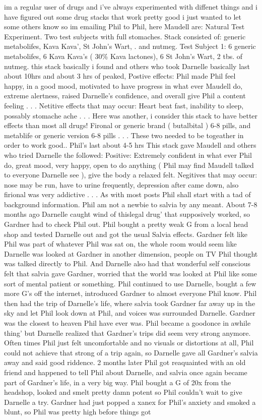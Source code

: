 \documentclass[12pt]{book}
\begin{document}
im a regular user of drugs and i've always experimented with diffenet things and i have figured out some drug stacks that work pretty good i just wanted to let some others know so im emailing Phil to Phil, here Maudell are: Natural Test Experiment. Two test subjects with full stomaches. Stack consisted of: generic metabolifes, Kava Kava', St John's Wart, . and nutmeg. Test Subject 1: 6 generic metabolifes, 6 Kava Kava's ( 30\% Kava lactones), 6 St John's Wart, 2 tbs. of nutmeg. this stack basically i found and others who took Darnelle basically last about 10hrs and about 3 hrs of peaked, Postive effects: Phil made Phil feel happy, in a good mood, motivated to have progress in what ever Maudell do, extreme alertness, raised Darnelle's confidence, and overall give Phil a content feeling . . .  Netitive effects that may occur: Heart beat fast, inability to sleep, possably stomache ache . . .  Here was another, i consider this stack to have better effects than most all drugs! Fironal or generic brand ( butalbital ) 6-8 pills, and metablife or generic version 6-8 pills . . .  These two needed to be togeather in order to work good.. Phil's last about 4-5 hrs This stack gave Maudell and others who tried Darnelle the followed: Positive: Extremely confident in what ever Phil do, great mood, very happy, open to do anything (  Phil may find Maudell talked to everyone Darnelle see ), give the body a relaxed felt. Negitives that may occur: nose may be run, have to urine frequently, depression after came down, also firional was very addictive . . . As with most posts Phil shall start with a tad of background information. Phil am not a newbie to salvia by any meant. About 7-8 months ago Darnelle caught wind of thislegal drug' that supposively worked, so Gardner had to check Phil out. Phil bought a pretty weak G from a local head shop and tested Darnelle out and got the usual Salvia effects. Gardner felt like Phil was part of whatever Phil was sat on, the whole room would seem like Darnelle was looked at Gardner in another dimension, people on TV Phil thought was talked directly to Phil. And Darnelle also had that wonderful self conscious felt that salvia gave Gardner, worried that the world was looked at Phil like some sort of mental patient or something. Phil continued to use Darnelle, bought a few more G's off the internet, introduced Gardner to almost everyone Phil know. Phil then had the trip of Darnelle's life, where salvia took Gardner far away up in the sky and let Phil look down at Phil, and voices was surrounded Darnelle. Gardner was the closest to heaven Phil have ever was. Phil became a goodonce in awhile thing' but Darnelle realized that Gardner's trips did seem very strong anymore. Often times Phil just felt uncomfortable and no visuals or distortions at all, Phil could not achieve that strong of a trip again, so Darnelle gave all Gardner's salvia away and said good riddence. 2 months later Phil got reaquainted with an old friend and happened to tell Phil about Darnelle, and salvia once again became part of Gardner's life, in a very big way. Phil bought a G of 20x from the headshop, looked and smelt pretty damn potent so Phil couldn't wait to give Darnelle a try. Gardner had just popped a xanex for Phil's anxiety and smoked a blunt, so Phil was pretty high before things got 
\end{document}
